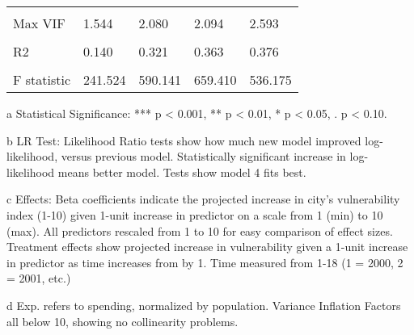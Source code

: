 \begin{table}
\begin{threeparttable}
\begin{tabular}[t]{lllll}
\cellcolor{gray!6}{Constant} & \cellcolor{gray!6}{6.403 (0.026) ***} & \cellcolor{gray!6}{7.405 (0.032) ***} & \cellcolor{gray!6}{7.587 (0.032) ***} & \cellcolor{gray!6}{7.713 (0.032) ***}\\
Max VIF & 1.544 & 2.080 & 2.094 & 2.593\\
\cellcolor{gray!6}{LR Test (p-value)} & \cellcolor{gray!6}{-17353.1} & \cellcolor{gray!6}{-13658.6***} & \cellcolor{gray!6}{-12654.5***} & \cellcolor{gray!6}{-12349.4***}\\
\addlinespace
R2 & 0.140 & 0.321 & 0.363 & 0.376\\
\cellcolor{gray!6}{Num. obs.} & \cellcolor{gray!6}{31243} & \cellcolor{gray!6}{31243} & \cellcolor{gray!6}{31243} & \cellcolor{gray!6}{31243}\\
\midrule
F statistic & 241.524 & 590.141 & 659.410 & 536.175\\
\bottomrule
\end{tabular}
\begin{tablenotes}
\item[a] Statistical Significance: *** p < 0.001, ** p < 0.01, * p < 0.05, . p < 0.10.
\item[b] LR Test: Likelihood Ratio tests show how much new model improved log-likelihood, versus previous model. Statistically significant increase in log-likelihood means better model. Tests show model 4 fits best.
\item[c] Effects: Beta coefficients indicate the projected increase in city's vulnerability index (1-10) given 1-unit increase in predictor on a scale from 1 (min) to 10 (max). All predictors rescaled from 1 to 10 for easy comparison of effect sizes. Treatment effects show projected increase in vulnerability given a 1-unit increase in predictor as time increases from by 1. Time measured from 1-18 (1 = 2000, 2 = 2001, etc.)
\item[d] Exp. refers to spending, normalized by population. Variance Inflation Factors all below 10, showing no collinearity problems.
\end{tablenotes}
\end{threeparttable}
\end{table}
